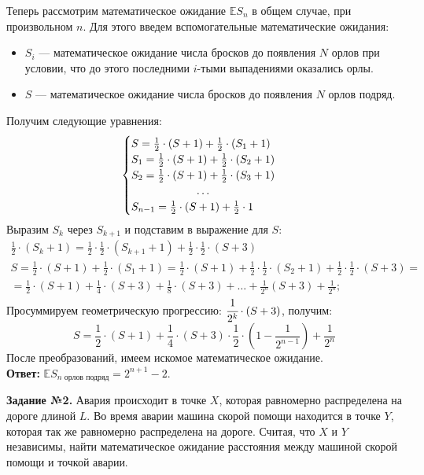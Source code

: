 \documentclass[a4paper, 12pt]{article}
\begin{document}
{Теперь рассмотрим математическое ожидание $\mathbb{E}{S_{n}}$ в общем случае, при произвольном $n$. Для этого введем вспомогательные математические ожидания:
\begin{itemize}
    \item $S_i$ — математическое ожидание числа бросков до появления $N$ орлов при условии, что до этого последними $i$-тыми выпадениями оказались орлы.
    \item $S$ — математическое ожидание числа бросков до появления $N$ орлов подряд.
\end{itemize}

Получим следующие уравнения:
\[
    \begin{cases}
        S = \frac{1}{2} \cdot (S + 1) + \frac{1}{2} \cdot (S_1 + 1) \\ 
        S_1 = \frac{1}{2} \cdot (S + 1) + \frac{1}{2} \cdot (S_2 + 1) \\ 
        S_2 = \frac{1}{2} \cdot (S + 1) + \frac{1}{2} \cdot (S_3 + 1) \\
        \hfill \dots \hfill \\ 
        S_{n-1} = \frac{1}{2} \cdot (S + 1) + \frac{1}{2} \cdot 1
    \end{cases}
\]
Выразим $S_k$ через $S_{k+1}$ и подставим в выражение для $S$:
\begin{gather*}
    \frac{1}{2} \cdot (S_k + 1) = \frac{1}{2} \cdot \frac{1}{2} \cdot (S_{k+1} + 1) + \frac{1}{2} \cdot \frac{1}{2} \cdot (S + 3) \\ 
    S = \frac{1}{2} \cdot (S + 1) + \frac{1}{2} \cdot (S_1 + 1) = \frac{1}{2} \cdot (S + 1) + \frac{1}{2} \cdot \frac{1}{2} \cdot (S_2 + 1) + \frac{1}{2} \cdot \frac{1}{2} \cdot (S + 3) = \\
    = \frac{1}{2} \cdot (S + 1) + \frac{1}{4} \cdot (S + 3) + \frac{1}{8} \cdot (S + 3) + \dots + \frac{1}{2^n}(S + 3) + \frac{1}{2^n};
\end{gather*}
Просуммируем геометрическую прогрессию: $\cfrac{1}{2^k} \cdot (S + 3)$, получим:
\[
    S = \frac{1}{2} \cdot (S + 1) + \frac{1}{4} \cdot (S + 3) \cdot \frac{1}{2} \cdot \left ( 1 - \frac{1}{2^{n-1}} \right ) + \frac{1}{2^n}
\]
После преобразований, имеем искомое математическое ожидание. \\ 

\textbf{Ответ:} $\mathbb{E}{S_{\text{$n$ орлов подряд}}} = 2^{n + 1} - 2$. 

\newpage

\textbf{Задание №2.} Авария происходит в точке $X$, которая равномерно распределена на дороге длиной $L$. Во время аварии машина скорой помощи находится в точке $Y$, которая так же равномерно распределена на дороге. Считая, что $X$ и $Y$ независимы, найти математическое ожидание расстояния между машиной скорой помощи и точкой аварии. 

}
\end{document}
